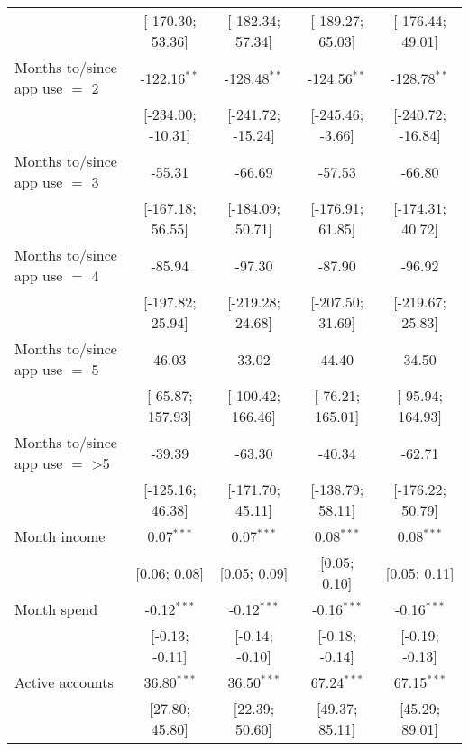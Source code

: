 \begin{table}[htbp]
\begin{threeparttable}[b]
\begin{tabular}{lcccc}
                                         & [-170.30; 53.36]  & [-182.34; 57.34]  & [-189.27; 65.03]  & [-176.44; 49.01]\\   
         Months to/since app use $=$ 2   & -122.16$^{**}$    & -128.48$^{**}$    & -124.56$^{**}$    & -128.78$^{**}$\\   
                                         & [-234.00; -10.31] & [-241.72; -15.24] & [-245.46; -3.66]  & [-240.72; -16.84]\\   
         Months to/since app use $=$ 3   & -55.31            & -66.69            & -57.53            & -66.80\\   
                                         & [-167.18; 56.55]  & [-184.09; 50.71]  & [-176.91; 61.85]  & [-174.31; 40.72]\\   
         Months to/since app use $=$ 4   & -85.94            & -97.30            & -87.90            & -96.92\\   
                                         & [-197.82; 25.94]  & [-219.28; 24.68]  & [-207.50; 31.69]  & [-219.67; 25.83]\\   
         Months to/since app use $=$ 5   & 46.03             & 33.02             & 44.40             & 34.50\\   
                                         & [-65.87; 157.93]  & [-100.42; 166.46] & [-76.21; 165.01]  & [-95.94; 164.93]\\   
         Months to/since app use $=$ >5  & -39.39            & -63.30            & -40.34            & -62.71\\   
                                         & [-125.16; 46.38]  & [-171.70; 45.11]  & [-138.79; 58.11]  & [-176.22; 50.79]\\   
         Month income                    & 0.07$^{***}$      & 0.07$^{***}$      & 0.08$^{***}$      & 0.08$^{***}$\\   
                                         & [0.06; 0.08]      & [0.05; 0.09]      & [0.05; 0.10]      & [0.05; 0.11]\\   
         Month spend                     & -0.12$^{***}$     & -0.12$^{***}$     & -0.16$^{***}$     & -0.16$^{***}$\\   
                                         & [-0.13; -0.11]    & [-0.14; -0.10]    & [-0.18; -0.14]    & [-0.19; -0.13]\\   
         Active accounts                 & 36.80$^{***}$     & 36.50$^{***}$     & 67.24$^{***}$     & 67.15$^{***}$\\   
                                         & [27.80; 45.80]    & [22.39; 50.60]    & [49.37; 85.11]    & [45.29; 89.01]\\   

\end{tabular}
\end{threeparttable}
\end{table}
